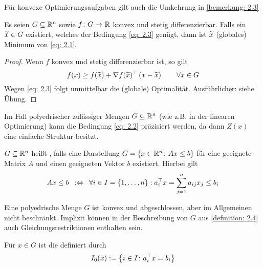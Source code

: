 Für konvexe Optimierungsaufgaben gilt auch die Umkehrung in \cref{bemerkung: 2.3}

\begin{aussage} %
	Es seien $G \subseteq \mathbb{R}^n$ sowie $\abb{f}{G}{\R}$ konvex und stetig differenzierbar. Falls ein $\widetilde{x} \in G$ existiert, welches der Bedingung \eqref{eq: 2.3} genügt, dann ist $\widetilde{x}$ (globales) Minimum von \eqref{eq: 2.1}.
\end{aussage}
\begin{proof}
	Wenn $f$ konvex und stetig differenzierbar ist, so gilt
	\begin{equation*}
	f(x) \ge f(\widetilde{x}) + \nabla f(\widetilde{x})^{\top} \left( x - \widetilde{x} \right) \qquad \forall x \in G
	\end{equation*}
	Wegen \eqref{eq: 2.3} folgt unmittelbar die (globale) Optimalität. Ausführlicher: siehe Übung.
\end{proof}

Im Fall polyedrischer zulässiger Mengen $G \subseteq \mathbb{R}^n$ (wie z.B. in der linearen Optimierung) kann die Bedingung \eqref{eq: 2.2} präzisiert werden, da dann $Z(x)$ eine einfache Struktur besitzt.

\begin{definition} %
	\label{definition: 2.4}
	$G \subseteq \mathbb{R}^n$ heißt , falls eine Darstellung $G = \left\{ x \in \mathbb{R}^n \colon Ax \le b \right\}$ für eine geeignete Matrix $A$ und einen geeigneten Vektor $b$ existiert. Hierbei gilt
	\begin{equation*}
	Ax \le b \enskip \mathrel{:\Leftrightarrow} \enskip \forall i \in I = \left\{ 1,\dots,n \right\}: a_i^{\top}x = \sum_{j=1}^n a_{ij}x_j \le b_i
	\end{equation*}
\end{definition}


\begin{bemerkung} %
	Eine polyedrische Menge $G$ ist konvex und abgeschlossen, aber im Allgemeinen nicht beschränkt. Implizit können in der Beschreibung von $G$ aus \cref{definition: 2.4} auch Gleichungsrestriktionen enthalten sein.
\end{bemerkung}

\begin{definition} %
	Für $x \in G$ ist die  definiert durch 
	\begin{equation*}
	I_0(x) \mathrel{:=} \left\{ i \in I \colon a_i^{\top} x = b_i \right\}
	\end{equation*}
\end{definition}

